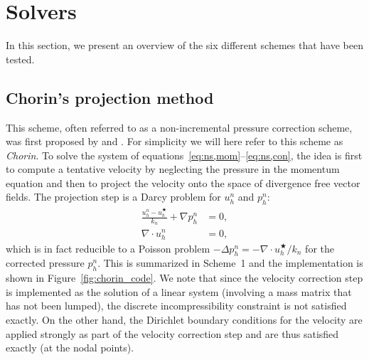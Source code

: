 \section{Solvers}
\label{methods}

In this section, we present an overview of the six different schemes
that have been tested.

\subsection{Chorin's projection method}
\label{sec:chorin}

This scheme, often referred to as a non-incremental pressure
correction scheme, was first proposed by \citet{Chorin1968} and
\citet{Temam1969}. For simplicity we will here refer to this scheme as
\emph{Chorin}. To solve the system of
equations~\eqref{eq:ns,mom}--\eqref{eq:ns,con}, the idea is first to
compute a tentative velocity by neglecting the pressure in the
momentum equation and then to project the velocity onto the space of
divergence free vector fields. The projection step is a Darcy problem
for $u_h^n$ and $p^n_h$:
\begin{align}
  \frac{u_h^n -u_h^{\bigstar}}{k_n} + \nabla p^n_h &= 0, \\
 \nabla \cdot u_h^n &= 0,
\end{align}
which is in fact reducible to a Poisson problem $-\Delta p^n_h =
- \nabla \cdot u_h^{\bigstar} / k_n$ for the corrected pressure
$p^n_h$. This is summarized in Scheme~1 and the implementation is
shown in Figure~\ref{fig:chorin_code}.  We note that since the
velocity correction step is implemented as the solution of a linear
system (involving a mass matrix that has not been lumped), the
discrete incompressibility constraint is not satisfied exactly. On the
other hand, the Dirichlet boundary conditions for the velocity are
applied strongly as part of the velocity correction step and are thus
satisfied exactly (at the nodal points).

